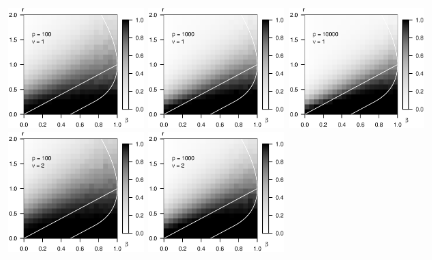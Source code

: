 \begin{figure}
      \centering
      \includegraphics[width=0.32\textwidth]{./sim_weak_boundary/simulated_weak_boundary_chi-squared_nu1_p100.eps}
      \includegraphics[width=0.32\textwidth]{./sim_weak_boundary/simulated_weak_boundary_chi-squared_nu1_p1000.eps}
      \includegraphics[width=0.32\textwidth]{./sim_weak_boundary/simulated_weak_boundary_chi-squared_nu1_p10000.eps}
      \includegraphics[width=0.32\textwidth]{./sim_weak_boundary/simulated_weak_boundary_chi-squared_nu2_p100.eps}
      \includegraphics[width=0.32\textwidth]{./sim_weak_boundary/simulated_weak_boundary_chi-squared_nu2_p1000.eps}

\end{figure}
